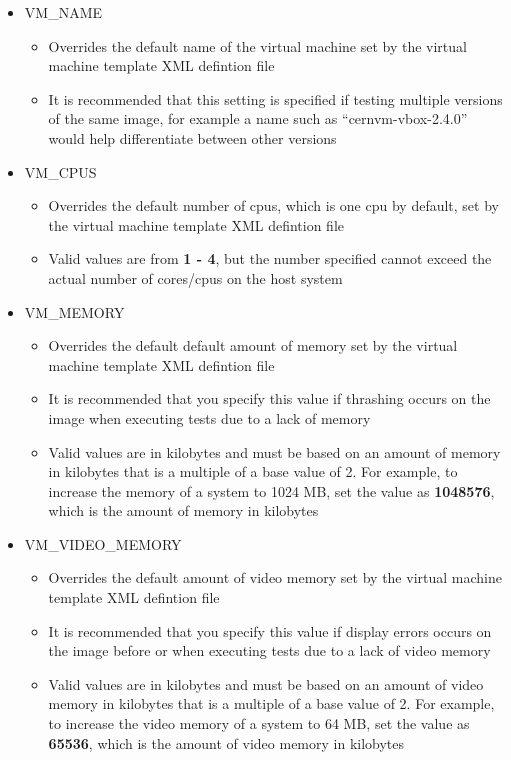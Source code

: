 \begin{itemize}
\item	VM\_NAME
		\begin{itemize}
		\item	Overrides the default name of the virtual machine set by the 
				virtual machine template XML defintion file
		\item	It is recommended that this setting is specified if testing multiple
				versions of the same \cernvm image, for example a name such as
				``cernvm-vbox-2.4.0'' would help differentiate between other versions
		\end{itemize}
		
\item	VM\_CPUS
		\begin{itemize}
		\item	Overrides the default number of cpus, which is one cpu by default,
				set by the virtual machine template XML defintion file
		\item	Valid values are from {\bf 1 - 4}, but the number specified cannot
				exceed the actual number of cores/cpus on the host system
		\end{itemize}
	
\item	VM\_MEMORY
		\begin{itemize}
		\item	Overrides the default default amount of memory set by the virtual machine
				template XML defintion file
		\item	It is recommended that you specify this value if thrashing occurs on the
				\cernvm image when executing tests due to a lack of memory
		\item	Valid values are in kilobytes and must be based on an amount of memory in
				kilobytes that is a multiple of a base value of 2. For example, to increase
				the memory of a system to 1024 MB, set the value as {\bf 1048576}, which is the
				amount of memory in kilobytes
		\end{itemize}
		
\item	VM\_VIDEO\_MEMORY
		\begin{itemize}
		\item	Overrides the default amount of video memory set by the virtual machine
				template XML defintion file
		\item	It is recommended that you specify this value if display errors occurs on the
				\cernvm image before or when executing tests due to a lack of video memory
		\item	Valid values are in kilobytes and must be based on an amount of video memory in
				kilobytes that is a multiple of a base value of 2. For example, to increase
				the video memory of a system to 64 MB, set the value as {\bf 65536}, which is the
				amount of video memory in kilobytes
		\end{itemize}
		

\end{itemize}
